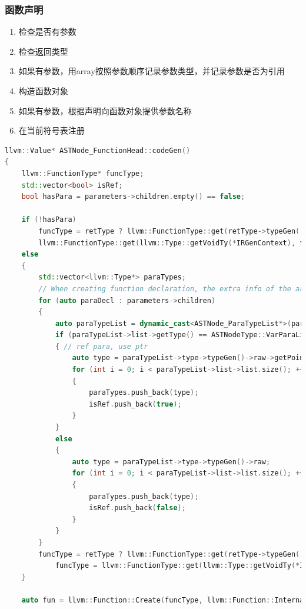 \documentclass{article}
\begin{document}
\subsubsection{函数声明}
\begin{enumerate}
  \item 检查是否有参数
  \item 检查返回类型
  \item 如果有参数，用array按照参数顺序记录参数类型，并记录参数是否为引用
  \item 构造函数对象
  \item 如果有参数，根据声明向函数对象提供参数名称
  \item 在当前符号表注册
\end{enumerate}

\begin{lstlisting}[language=C++]
llvm::Value* ASTNode_FunctionHead::codeGen()
{
    llvm::FunctionType* funcType;
    std::vector<bool> isRef;
    bool hasPara = parameters->children.empty() == false;

    if (!hasPara)
        funcType = retType ? llvm::FunctionType::get(retType->typeGen()->raw, false) :
        llvm::FunctionType::get(llvm::Type::getVoidTy(*IRGenContext), false);
    else
    {
        std::vector<llvm::Type*> paraTypes;
        // When creating function declaration, the extra info of the arg type is thrown
        for (auto paraDecl : parameters->children)
        {
            auto paraTypeList = dynamic_cast<ASTNode_ParaTypeList*>(paraDecl);
            if (paraTypeList->list->getType() == ASTNodeType::VarParaList)
            { // ref para, use ptr
                auto type = paraTypeList->type->typeGen()->raw->getPointerTo();
                for (int i = 0; i < paraTypeList->list->list.size(); ++i)
                {
                    paraTypes.push_back(type);
                    isRef.push_back(true);
                }
            }
            else
            {
                auto type = paraTypeList->type->typeGen()->raw;
                for (int i = 0; i < paraTypeList->list->list.size(); ++i)
                {
                    paraTypes.push_back(type);
                    isRef.push_back(false);
                }
            }
        }
        funcType = retType ? llvm::FunctionType::get(retType->typeGen()->raw, paraTypes, false) :
            funcType = llvm::FunctionType::get(llvm::Type::getVoidTy(*IRGenContext), paraTypes, false);
    }

    auto fun = llvm::Function::Create(funcType, llvm::Function::InternalLinkage, name, *IRGenModule);


\end{lstlisting}
\end{document}
